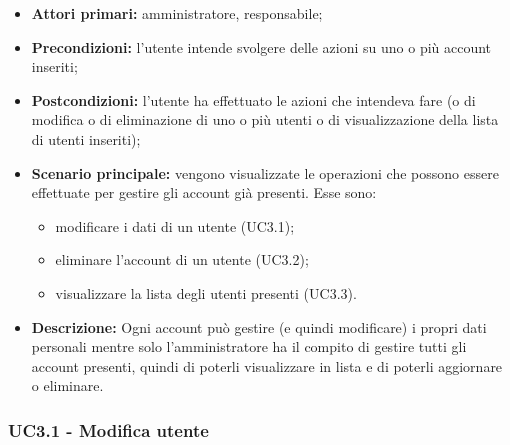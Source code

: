\begin{itemize}
	\item 	\textbf{Attori primari:} amministratore, responsabile;
	\item 	\textbf{Precondizioni:} l'utente intende svolgere delle azioni su uno o più account inseriti;
	\item 	\textbf{Postcondizioni:} l'utente ha effettuato le azioni che intendeva fare (o di modifica o di eliminazione di uno o più utenti o di visualizzazione della lista di utenti inseriti);
	\item 	\textbf{Scenario principale:} vengono visualizzate le operazioni che possono essere effettuate per gestire gli account già presenti. Esse sono:
	\begin{itemize}
		\item modificare i dati di un utente (UC3.1);
		\item eliminare l'account di un utente (UC3.2);
		\item visualizzare la lista degli utenti presenti (UC3.3).
	\end{itemize}
	\item 	\textbf{Descrizione:} Ogni account può gestire (e quindi modificare) i propri dati personali mentre solo l'amministratore ha il compito di gestire tutti gli account presenti, quindi di poterli visualizzare in lista e di poterli aggiornare o eliminare.
\end{itemize}

\subsubsection{UC3.1 - Modifica utente}

